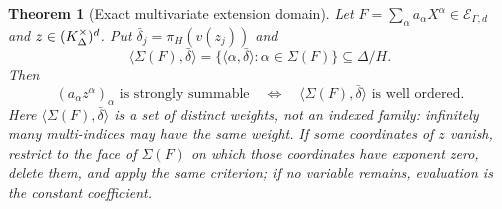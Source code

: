 \documentclass[11pt]{article}
\newtheorem{theorem}{Theorem}[section]
\theoremstyle{plain}
\theoremstyle{plain}
\theoremstyle{plain}
\theoremstyle{definition}
\theoremstyle{definition}
\theoremstyle{definition}
\theoremstyle{definition}
\theoremstyle{remark}
\newcommand{\inner}[2]{\langle#1,#2\rangle}
\begin{document}
\begin{theorem}[Exact multivariate extension domain]\label{ent:mv:thm:domain}
Let $F=\sum_\alpha a_\alpha X^\alpha\in\mathcal E_{\Gamma,d}$ and
$z\in(K_\Delta^\times)^d$. Put $\bar\delta_j=\pi_H(v(z_j))$ and
\[
 \inner{\Sigma(F)}{\bar\delta}=\{\inner\alpha{\bar\delta}:\alpha\in\Sigma(F)\}
 \subseteq\Delta/H .
\]
Then
\begin{equation}\label{ent:mv:eq:main}
 (a_\alpha z^\alpha)_\alpha\text{ is strongly summable}
 \quad\Longleftrightarrow\quad
 \inner{\Sigma(F)}{\bar\delta}\text{ is well ordered.}
\end{equation}
Here $\inner{\Sigma(F)}{\bar\delta}$ is a set of distinct weights, not an
indexed family: infinitely many multi-indices may have the same weight. If
some coordinates of $z$ vanish, restrict to the face of $\Sigma(F)$ on which
those coordinates have exponent zero, delete them, and apply the same
criterion; if no variable remains, evaluation is the constant coefficient.
\end{theorem}
\end{document}
